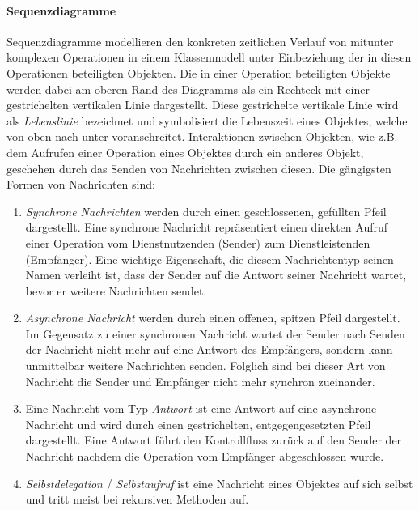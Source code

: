 \FloatBarrier

\paragraph{Sequenzdiagramme}
\label{sec3:model:par:seq-use-cases}
Sequenzdiagramme modellieren den konkreten zeitlichen Verlauf von mitunter komplexen Operationen in einem Klassenmodell unter Einbeziehung der in diesen Operationen beteiligten Objekten.
Die in einer Operation beteiligten Objekte werden dabei am oberen Rand des Diagramms als ein Rechteck mit einer gestrichelten vertikalen Linie dargestellt.
Diese gestrichelte vertikale Linie wird als \textit{Lebenslinie} bezeichnet und symbolisiert die Lebenszeit eines Objektes, welche von oben nach unter voranschreitet.
Interaktionen zwischen Objekten, wie z.B. dem Aufrufen einer Operation eines Objektes durch ein anderes Objekt, geschehen durch das Senden von Nachrichten zwischen diesen.
Die gängigsten Formen von Nachrichten sind:



\begin{enumerate}[label=(\roman{enumi})]
    \item \textit{Synchrone Nachrichten} werden durch einen geschlossenen, gefüllten Pfeil  dargestellt.
    Eine synchrone Nachricht repräsentiert einen direkten Aufruf einer Operation vom Dienstnutzenden (Sender) zum Dienstleistenden (Empfänger).
    Eine wichtige Eigenschaft, die diesem Nachrichtentyp seinen Namen verleiht ist, dass der Sender auf die Antwort seiner Nachricht wartet, bevor er weitere Nachrichten sendet.
    \item \textit{Asynchrone Nachricht} werden durch einen offenen, spitzen Pfeil  dargestellt.
    Im Gegensatz zu einer synchronen Nachricht wartet der Sender nach Senden der Nachricht nicht mehr auf eine Antwort des Empfängers, sondern kann unmittelbar weitere Nachrichten senden.
    Folglich sind bei dieser Art von Nachricht die Sender und Empfänger nicht mehr synchron zueinander.
    \item Eine Nachricht vom Typ \textit{Antwort} ist eine Antwort auf eine asynchrone Nachricht und wird durch einen gestrichelten, entgegengesetzten Pfeil  dargestellt.
    Eine Antwort führt den Kontrollfluss zurück auf den Sender der Nachricht nachdem die Operation vom Empfänger abgeschlossen wurde.
    \item \textit{Selbstdelegation} / \textit{Selbstaufruf} ist eine Nachricht eines Objektes auf sich selbst und tritt meist bei rekursiven Methoden auf.
\end{enumerate}

